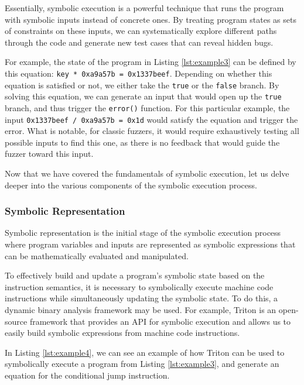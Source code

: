 Essentially, symbolic execution is a powerful technique that runs the program with symbolic inputs instead of concrete ones. By treating program states as sets of constraints on these inputs, we can systematically explore different paths through the code and generate new test cases that can reveal hidden bugs.

For example, the state of the program in Listing \ref{lst:example3} can be defined by this equation: \texttt{key * 0xa9a57b = 0x1337beef}. Depending on whether this equation is satisfied or not, we either take the \texttt{true} or the \texttt{false} branch. By solving this equation, we can generate an input that would open up the \texttt{true} branch, and thus trigger the \texttt{error()} function. For this particular example, the input \texttt{0x1337beef / 0xa9a57b = 0x1d} would satisfy the equation and trigger the error. What is notable, for classic fuzzers, it would require exhaustively testing all possible inputs to find this one, as there is no feedback that would guide the fuzzer toward this input.

Now that we have covered the fundamentals of symbolic execution, let us delve deeper into the various components of the symbolic execution process.

\subsubsection{Symbolic Representation}

Symbolic representation is the initial stage of the symbolic execution process where program variables and inputs are represented as symbolic expressions that can be mathematically evaluated and manipulated.

To effectively build and update a program's symbolic state based on the instruction semantics, it is necessary to symbolically execute machine code instructions while simultaneously updating the symbolic state. To do this, a dynamic binary analysis framework may be used. For example, Triton \cite{triton-sstic2015} is an open-source framework that provides an API for symbolic execution and allows us to easily build symbolic expressions from machine code instructions.

In Listing \ref{lst:example4}, we can see an example of how Triton can be used to symbolically execute a program from Listing \ref{lst:example3}, and generate an equation for the conditional jump instruction.



